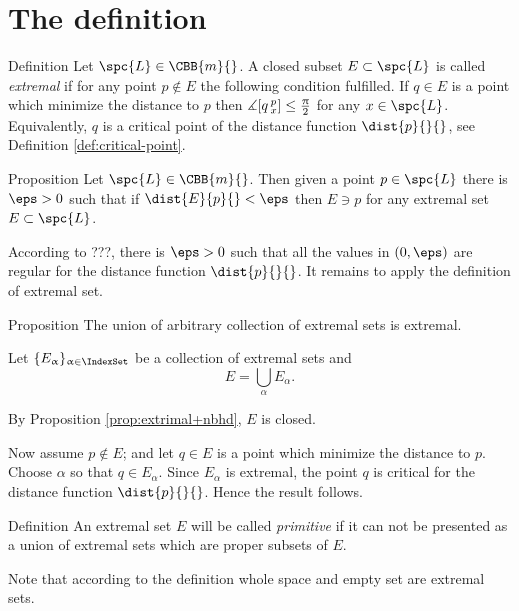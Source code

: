 \section{The definition}

\begin{thm}{Definition}
Let $\spc{L}\in\CBB{m}{}$.
A closed subset $E\subset \spc{L}$ 
is called \emph{extremal}
if for any point $p\notin E$ the following condition fulfilled.
If $q\in E$ is a point which minimize the distance to $p$
then $\mangle \hinge q p x\le\tfrac\pi2$ for any $x\in\spc{L}$.
Equivalently, $q$ is a critical point of the distance function $\dist{p}{}{}$,  
see Definition \ref{def:critical-point}.
\end{thm}

\begin{thm}{Proposition}\label{prop:extrimal+nbhd}
Let $\spc{L}\in\CBB{m}{}$.
Then given a point $p\in \spc{L}$ there is $\eps>0$ such that 
if $\dist{E}{p}{}<\eps$ then $E\ni p$
for any extremal set $E\subset \spc{L}$.
\end{thm}

According to ???, there is $\eps>0$ such that all the values in $(0,\eps)$ are regular for the distance function $\dist{p}{}{}$.
It remains to apply the definition of extremal set.
\qeds

\begin{thm}{Proposition}
The union of arbitrary collection of extremal sets is extremal. 
\end{thm}

Let $\{E_\alpha\}_{\alpha\in\IndexSet}$ be a collection of extremal sets
and 
$$E=\bigcup_\alpha E_\alpha.$$

By Proposition \ref{prop:extrimal+nbhd}, $E$ is closed.

Now assume $p\notin E$; and let $q\in E$ is a point which minimize the distance to $p$. 
Choose $\alpha$ so that $q\in E_\alpha$.
Since $E_\alpha$ is extremal, the point $q$ is critical for the distance function $\dist{p}{}{}$.
Hence the result follows.
\qeds

\begin{thm}{Definition}\label{def:prim-extr-set}
An extremal set $E$ will be called \emph{primitive}
if it can not be presented as a union of extremal sets which are proper subsets of $E$.
\end{thm}

Note that according to the definition whole space and empty set are extremal sets.


